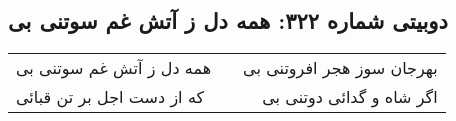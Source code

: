 \begin{center}
\section*{دوبیتی شماره ۳۲۲: همه دل ز آتش غم سوتنی بی}
\label{sec:322}
\begin{longtable}{l p{0.5cm} r}
همه دل ز آتش غم سوتنی بی
&&
بهرجان سوز هجر افروتنی بی
\\
که از دست اجل بر تن قبائی
&&
اگر شاه و گدائی دوتنی بی
\\
\end{longtable}
\end{center}
